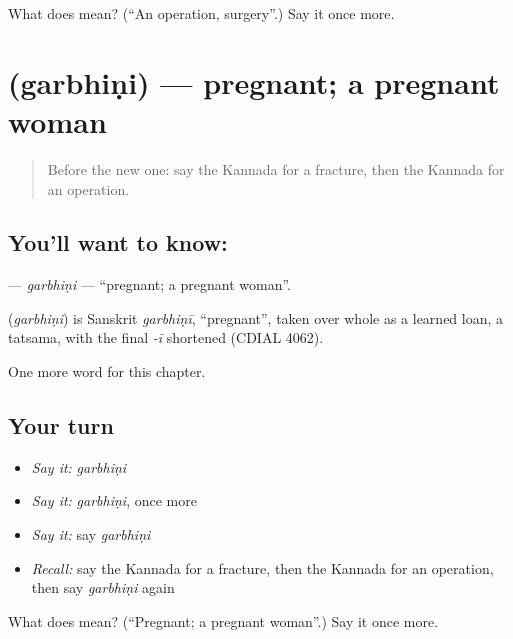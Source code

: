 \begin{tcolorbox}[breakable,colback=teal!4,colframe=teal!35!black,title={Before you move on}]
What does  mean? (\textquotedblleft{}An operation, surgery\textquotedblright{}.) Say it once more.
\end{tcolorbox}
\section[\texorpdfstring{\kn{ಗರ್ಭಿಣಿ} (garbhiṇi)}{ಗರ್ಭಿಣಿ (garbhiṇi)}]{ (garbhiṇi) — pregnant; a pregnant woman}

\label{lesson:KA-C283-garbhini}



\begin{quote}
Before the new one: say the Kannada for a fracture, then the Kannada for an operation.
\end{quote}

\subsection*{You'll want to know: }
\textbf{} — \emph{garbhiṇi} — \textquotedblleft{}pregnant; a pregnant woman\textquotedblright{}.

\begin{cousinweb}
\textbf{} (\emph{garbhiṇi}) is Sanskrit \emph{garbhiṇī}, \textquotedblleft{}pregnant\textquotedblright{}, taken over whole as a learned loan, a tatsama, with the final \emph{-ī} shortened (CDIAL 4062).
\end{cousinweb}

\begin{grammarlens}[title={What you've built}]
One more word for this chapter.
\end{grammarlens}

\subsection*{Your turn}
\begin{itemize}
\raggedright
  \item \emph{Say it:} \emph{garbhiṇi}
  \item \emph{Say it:} \emph{garbhiṇi}, once more
  \item \emph{Say it:} say \emph{garbhiṇi}
  \item \emph{Recall:} say the Kannada for a fracture, then the Kannada for an operation, then say \emph{garbhiṇi} again
\end{itemize}

\begin{tcolorbox}[breakable,colback=teal!4,colframe=teal!35!black,title={Before you move on}]
What does  mean? (\textquotedblleft{}Pregnant; a pregnant woman\textquotedblright{}.) Say it once more.
\end{tcolorbox}
